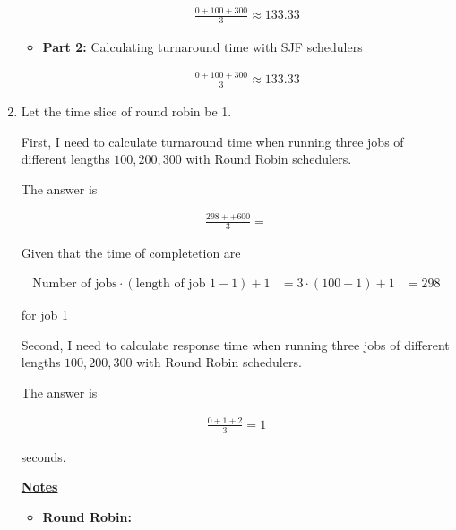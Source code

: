 \documentclass[12pt]{article}
\begin{document}
\begin{enumerate}[1.]
\begin{itemize}
        \bigskip

        \begin{align}
            \frac{0 + 100 + 300}{3} \approx 133.33
        \end{align}

        \item \textbf{Part 2:} Calculating turnaround time with SJF schedulers

        \begin{align}
            \frac{0 + 100 + 300}{3} \approx 133.33
        \end{align}

    \end{itemize}

    \item
    \setcounter{equation}{0}
    Let the time slice of round robin be 1.

    \bigskip

    First, I need to calculate turnaround time when running three jobs of different lengths
    $100, 200, 300$ with Round Robin schedulers.

    \bigskip

    The answer is

    \begin{align}
        \frac{298 + + 600}{3} =
    \end{align}

    Given that the time of completetion are

    \begin{align}
        \text{Number of jobs} \cdot (\text{length of job 1} - 1) + 1 &= 3 \cdot (100 - 1) + 1
        &= 298
    \end{align}

    for job 1

    \bigskip

    Second, I need to calculate response time when running three jobs of different lengths
    $100, 200, 300$ with Round Robin schedulers.

    \bigskip

    The answer is


    \begin{align}
        \frac{0 + 1 + 2}{3} = 1
    \end{align}

    seconds.

    \bigskip

    \underline{\textbf{Notes}}

    \begin{itemize}
        \item \textbf{Round Robin:}


\end{itemize}
\end{enumerate}
\end{document}
